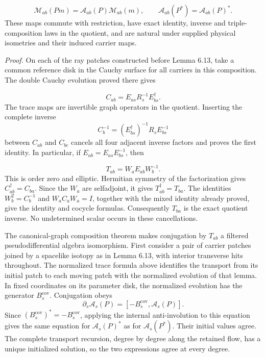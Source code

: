 \documentclass[
  english,
  11pt,
  reqno]{amsart}
\begin{document}
\label{eq:online-wave-carrier-algebra-module-identities}
\[
\mathcal M_{ab}(Pm)=\mathcal A_{ab}(P)\mathcal M_{ab}(m),
\qquad
\mathcal A_{ab}(P^*)=\mathcal A_{ab}(P)^*.
\] These maps commute with restriction, have exact identity, inverse and
triple-composition laws in the quotient, and are natural under supplied
physical isometries and their induced carrier maps.

\emph{Proof.} On each of the ray patches constructed before Lemma 6.13,
take a common reference disk in the Cauchy surface for all carriers in
this composition. The double Cauchy evolution proved there gives

\label{eq:online-wave-carrier-common-factorization} \[
C_{ab}=E_{as}R_s^{-1}E_{bs}^\dagger.
\] The trace maps are invertible graph operators in the quotient.
Inserting the complete inverse \[
C_b^{-1}=(E_{bs}^\dagger)^{-1}R_sE_{bs}^{-1}
\] between \(C_{ab}\) and \(C_{bc}\) cancels all four adjacent inverse
factors and proves the first identity. In particular, if
\(E_{ab}=E_{as}E_{bs}^{-1}\), then

\label{eq:online-wave-carrier-normalized-trace} \[
T_{ab}=W_aE_{ab}W_b^{-1}.
\] This is order zero and elliptic. Hermitian symmetry of the
factorization gives \(C_{ab}^\dagger=C_{ba}\). Since the \(W_a\) are
selfadjoint, it gives \(T_{ab}^\dagger=T_{ba}\). The identities
\(W_b^2=C_b^{-1}\) and \(W_aC_aW_a=I\), together with the mixed identity
already proved, give the identity and cocycle formulas. Consequently
\(T_{ba}\) is the exact quotient inverse. No undetermined scalar occurs
in these cancellations.

The canonical-graph composition theorem makes conjugation by \(T_{ab}\)
a filtered pseudodifferential algebra isomorphism. First consider a pair
of carrier patches joined by a spacelike isotopy as in Lemma 6.13, with
interior transverse hits throughout. The normalized trace formula above
identifies the transport from its initial patch to each moving patch
with the normalized evolution of that lemma. In fixed coordinates on its
parameter disk, the normalized evolution has the generator
\(B_s^{\mathrm{cov}}\). Conjugation obeys \[
\partial_s\mathcal A_s(P)
=[-B_s^{\mathrm{cov}},\mathcal A_s(P)].
\] Since \((B_s^{\mathrm{cov}})^*=-B_s^{\mathrm{cov}}\), applying the
internal anti-involution to this equation gives the same equation for
\(\mathcal A_s(P)^*\) as for \(\mathcal A_s(P^*)\). Their initial values
agree. The complete transport recursion, degree by degree along the
retained flow, has a unique initialized solution, so the two expressions
agree at every degree.
\end{document}

